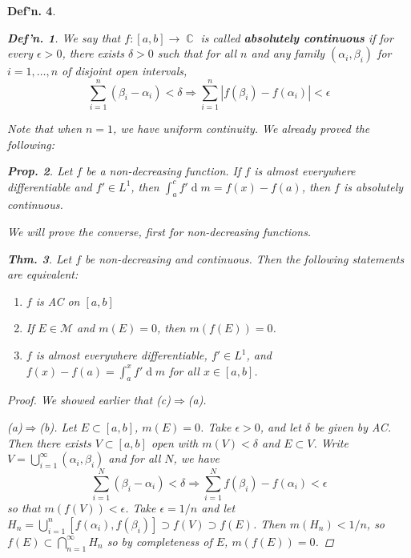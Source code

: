 \documentclass[12pt, a4paper]{book}
\DeclareMathOperator{\C}{\mathbb{C}}
\renewcommand{\d}[1]{\ensuremath{\operatorname{d}\!{#1}}} %
\newtheorem{theorem}{Thm.}[section]
\newtheorem{definition}[theorem]{Def'n.}
\newtheorem{proposition}[theorem]{Prop.}
\theoremstyle{nonumberplain}
\newtheorem{proof}{Proof}
\begin{document}
\begin{definition}
\begin{definition}
    We say that $f:[a,b]\to\C$ is called \textbf{absolutely continuous} if for every $\epsilon>0$, there exists $\delta>0$ such that for all $n$ and any family $(\alpha_i,\beta_i)$ for $i=1,\ldots,n$ of disjoint open intervals,
    \[\sum\limits_{i=1}^n(\beta_i-\alpha_i)<\delta\Longrightarrow\sum\limits_{i=1}^n|f(\beta_i)-f(\alpha_i)|<\epsilon\]
\end{definition}
Note that when $n=1$, we have uniform continuity.
We already proved the following:
\begin{proposition}
    Let $f$ be a non-decreasing function.
    If $f$ is almost everywhere differentiable and $f'\in L^1$, then $\int_a^c f'\d{m}=f(x)-f(a)$, then $f$ is absolutely continuous.
\end{proposition}
We will prove the converse, first for non-decreasing functions.
\begin{theorem}
    Let $f$ be non-decreasing and continuous.
    Then the following statements are equivalent:
    \begin{enumerate}[nolistsep]
        \item $f$ is AC on $[a,b]$
        \item If $E\in\mathcal{M}$ and  $m(E)=0$, then $m(f(E))=0$.
        \item $f$ is almost everywhere differentiable, $f'\in L^1$, and $f(x)-f(a)=\int_a^x f'\d{m}$ for all $x\in[a,b]$.
    \end{enumerate}
\end{theorem}
\begin{proof}
    We showed earlier that (c)$\Rightarrow$(a).

    (a)$\Rightarrow$(b).
    Let $E\subset[a,b]$, $m(E)=0$.
    Take $\epsilon>0$, and let $\delta$ be given by AC.
    Then there exists $V\subset[a,b]$ open with $m(V)<\delta$ and $E\subset V$.
    Write $V=\bigcup_{i=1}^\infty(\alpha_i,\beta_i)$ and for all $N$, we have
    \[\sum\limits_{i=1}^N(\beta_i-\alpha_i)<\delta\Longrightarrow\sum\limits_{i=1}^N f(\beta_i)-f(\alpha_i)<\epsilon\]
    so that $m(f(V))<\epsilon$.
    Take $\epsilon=1/n$ and let $H_n=\bigcup_{i=1}^n[f(\alpha_i),f(\beta_i)]\supset f(V)\supset f(E)$.
    Then $m(H_n)<1/n$, so $f(E)\subset\bigcap_{n=1}^\infty H_n$ so by completeness of $E$, $m(f(E))=0$.


\end{proof}
\end{definition}
\end{document}
